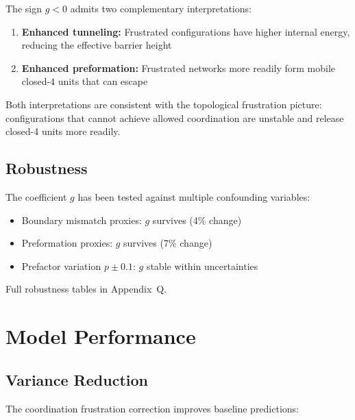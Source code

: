 The sign $g < 0$ admits two complementary interpretations:

\begin{enumerate}
    \item \textbf{Enhanced tunneling:} Frustrated configurations have higher
          internal energy, reducing the effective barrier height
    \item \textbf{Enhanced preformation:} Frustrated networks more readily
          form mobile closed-4 units that can escape
\end{enumerate}

Both interpretations are consistent with the topological frustration picture:
configurations that cannot achieve allowed coordination are unstable and
release closed-4 units more readily. \tagP

\subsection{Robustness}

\begin{quarantinebox}[title=Appendix Q: Robustness Analysis]
    The coefficient $g$ has been tested against multiple confounding variables:
    \begin{itemize}
        \item Boundary mismatch proxies: $g$ survives (4\% change)
        \item Preformation proxies: $g$ survives (7\% change)
        \item Prefactor variation $p \pm 0.1$: $g$ stable within uncertainties
    \end{itemize}
    Full robustness tables in Appendix~Q.
\end{quarantinebox}

\section{Model Performance}
\label{sec:frustrated:performance}

\subsection{Variance Reduction}

The coordination frustration correction improves baseline predictions:

